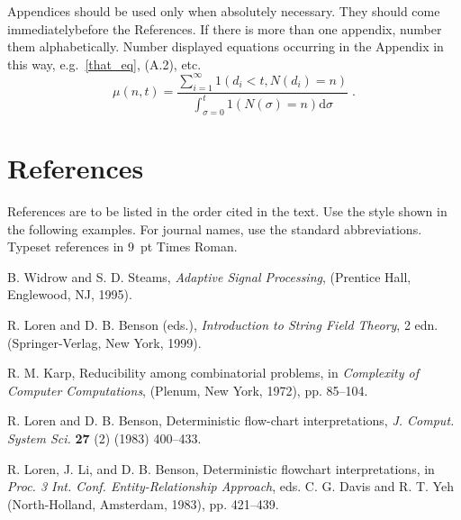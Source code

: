 \documentclass[11pt,twoside]{article}
\def\labart{yourLabel}      %
\begin{document}
\begin{multicols}{2}
Appendices should be used only when absolutely necessary. They should come immediately\break before the References. If there is more than one appendix, number them alphabetically. Number\break
displayed equations occurring in the Appendix in this way, e.g.~\eqref{that_eq}, (A.2), etc.
\begin{equation}
\mu(n,t) = \frac{\displaystyle\sum^\infty_{i=1} 1(d_i < t, N(d_i) = n)}{\displaystyle\int^t_{\sigma=0} 1(N(\sigma) = n)\mathrm{d}\sigma}\; .
\label{that_eq}
\end{equation}

\section*{References}

References are to be listed in the order cited in the text. Use the style shown in the following examples. For journal names, use the standard abbreviations. Typeset references in 9~pt Times Roman.


%
\begin{thebibliography}{000}
%
%

B. Widrow and S. D. Steams, \emph{Adaptive Signal Processing}, (Prentice Hall, Englewood, NJ, 1995).

R. Loren and D. B. Benson (eds.), \emph{Introduction to String Field Theory}, 2 edn. (Springer-Verlag, New York, 1999).

R. M. Karp, Reducibility among combinatorial problems, in \emph{Complexity of Computer Computations}, (Plenum, New York, 1972), pp. 85--104.

R. Loren and D. B. Benson, Deterministic flow-chart interpretations, \emph{J. Comput. System Sci.} \textbf{27} (2) (1983) 400--433.

R. Loren, J. Li, and D. B. Benson, Deterministic flowchart interpretations, in \emph{Proc. 3 Int. Conf. Entity-Relationship Approach}, eds. C. G. Davis and R. T. Yeh
(North-Holland, Amsterdam, 1983), pp. 421--439.

\label{\labart-LastPage}
\end{thebibliography}
\end{multicols}
\end{document}

